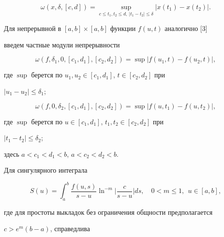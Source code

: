 $$


\omega(x,\delta,[c,d])=


\sup_{c\le t_1,t_2\le d,\ |t_1-t_2|\le\delta}


|x(t_1)-x(t_2)|.


$$


Для непрерывной в $[a,b]\times[a,b]$ функции $f(u,t)$ аналогично [3] 


введем частные модули непрерывности


$$


\omega(f,\delta_1,0,[c_1,d_1],[c_2,d_2])=


\sup|f(u_1,t)-f(u_2,t)|,


$$


где $\sup$ берется по $u_1,u_2\in[c_1,d_1]$, $t\in[c_2,d_2]$ при 


$|u_1-u_2|\le\delta_1$;


$$


\omega(f,0,\delta_2,[c_1,d_1],[c_2,d_2])=\sup


|f(u,t_1)-f(u,t_2)|,


$$


где $\sup$ берется по $u\in[c_1,d_1]$, $t_1,t_2\in[c_2,d_2]$ при 


$|t_1-t_2|\le\delta_2$;


здесь $a<c_1<d_1<b$, $a<c_2<d_2<b$.





Для сингулярного интеграла


\begin{equation}


S(u)=\int^b_a \frac{f(u,s)}{s-u}\ln^{-m}


\bigg|\frac{c}{s-u}\bigg|d s,\quad 0<m\le1,\ \ u\in[a,b],


\end{equation}


где для простоты выкладок без ограничения общности предполагается 


$c>e^m(b-a)$, справедлива






